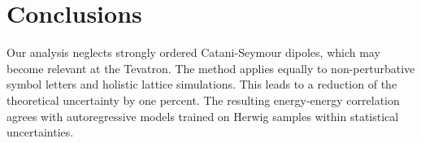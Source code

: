 \section{Conclusions}\label{sec:conclusions}

Our analysis neglects strongly ordered Catani-Seymour dipoles, which may
become relevant at the Tevatron. The method applies equally to
non-perturbative symbol letters and holistic lattice simulations. This
leads to a reduction of the theoretical uncertainty by one percent. The
resulting energy-energy correlation agrees with autoregressive models
trained on Herwig samples within statistical uncertainties.


